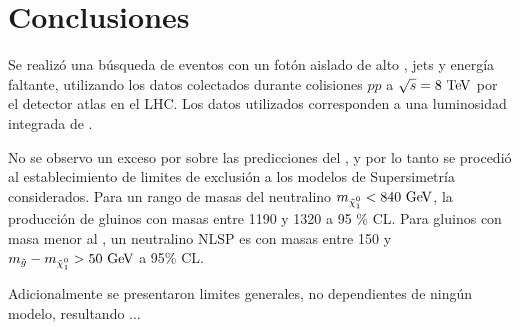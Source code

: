 \chapter{Conclusiones}

Se realizó una búsqueda de eventos con un fotón aislado
de alto {\pt}, jets y energía faltante, utilizando los
datos colectados durante colisiones $pp$ a $\sqrt{s}=8 \tev$
por el detector atlas en el LHC. Los datos utilizados
corresponden a una luminosidad integrada de {\ilumi}.

No se observo un exceso por sobre las predicciones
del {\SM}, y por lo tanto se procedió al establecimiento
de limites de exclusión a los modelos de Supersimetría
considerados. Para un rango de masas del neutralino
$m_{\ninoone} < 840 \gev$, la producción de gluinos
con masas entre 1190 y 1320 \gev a 95 \% CL. Para
gluinos con masa menor al \tev, un neutralino NLSP
es con masas entre 150 {\gev} y $m_{\gluino}-m_{\ninoone} > 50 \gev$
a 95\% CL.

Adicionalmente se presentaron limites generales,
no dependientes de ningún modelo, resultando ...
